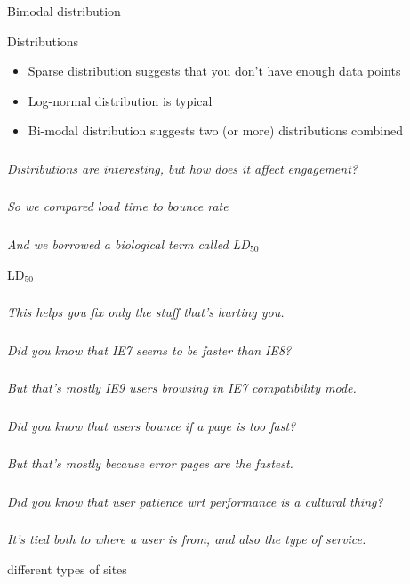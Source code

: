 \documentclass{beamer}
\newcommand{\innersplash}[1]{
  \begin{center}
    \Large \textrm{\textit{ #1 } }
  \end{center}
}
\newcommand{\splashslide}[2][{}]{
  \begin{frame}
  \frametitle{#1}
  \innersplash{#2}
  \end{frame}
}
\newcommand{\textsubscript}[1]{\ensuremath{_{\textrm{#1}}}}
\begin{document}
\begin{frame}{Bimodal distribution}
\end{frame}

\begin{frame}{Distributions}
\begin{itemize}
  \item Sparse distribution suggests that you don't have enough data points
  \item Log-normal distribution is typical
  \item Bi-modal distribution suggests two (or more) distributions combined
\end{itemize}
\end{frame}

\splashslide{Distributions are interesting, but how does it affect engagement?}

\splashslide{So we compared load time to bounce rate}

\splashslide{And we borrowed a biological term called LD\textsubscript{50}}

\begin{frame}{LD\textsubscript{50}}
\end{frame}

\splashslide{This helps you fix only the stuff that's hurting you.}

\splashslide{Did you know that IE7 seems to be faster than IE8?}
\splashslide{But that's mostly IE9 users browsing in IE7 compatibility mode.}

\splashslide{Did you know that users bounce if a page is too fast?}
\splashslide{But that's mostly because error pages are the fastest.}

\splashslide{Did you know that user patience wrt performance is a cultural thing?}
\splashslide{It's tied both to where a user is from, and also the type of service.}

\begin{frame}{different types of sites}
\end{frame}
\end{document}
